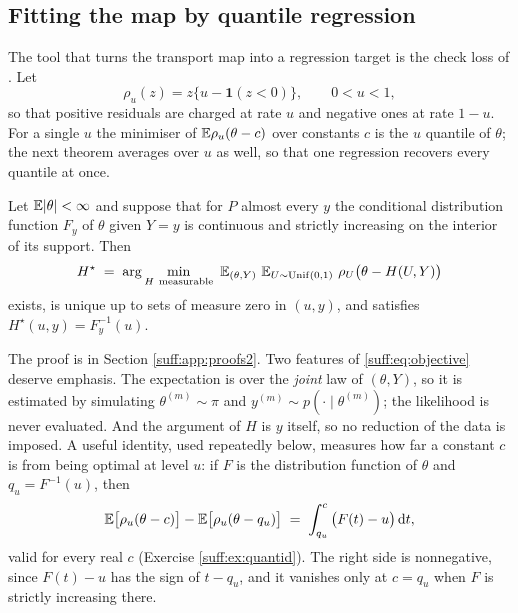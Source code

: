 \subsection{Fitting the map by quantile regression}

The tool that turns the transport map into a regression target is the check loss of
\citet{suff:koenkerbassett1978}. Let
\[
\rho_u(z) = z\{u-\mathbf{1}(z<0)\},\qquad 0<u<1,
\]
so that positive residuals are charged at rate $u$ and negative ones at rate $1-u$. For a
single $u$ the minimiser of $\mathbb{E}\rho_u(\theta-c)$ over constants $c$ is the $u$ quantile of
$\theta$; the next theorem averages over $u$ as well, so that one regression recovers every
quantile at once.

\begin{theorem}
\label{suff:thm:check}
Let $\mathbb{E}|\theta|<\infty$ and suppose that for $P$ almost every $y$ the conditional
distribution function $F_y$ of $\theta$ given $Y=y$ is continuous and strictly increasing on
the interior of its support. Then
\begin{equation}
H^\star \;=\; \arg\min_{H\ \mathrm{measurable}}\ \E_{(\theta,Y)}\ \E_{U\sim\mathrm{Unif}(0,1)}\
\rho_U\big(\theta - H(U,Y)\big)
\label{suff:eq:objective}
\end{equation}
exists, is unique up to sets of measure zero in $(u,y)$, and satisfies
$H^\star(u,y) = F^{-1}_{y}(u)$.
\end{theorem}

The proof is in Section \ref{suff:app:proofs2}. Two features of \eqref{suff:eq:objective}
deserve emphasis. The expectation is over the \emph{joint} law of $(\theta,Y)$, so it is
estimated by simulating $\theta^{(m)}\sim\pi$ and $y^{(m)}\sim p(\cdot\mid\theta^{(m)})$; the
likelihood is never evaluated. And the argument of $H$ is $y$ itself, so no reduction of the
data is imposed. A useful identity, used repeatedly below, measures how far a constant $c$ is
from being optimal at level $u$: if $F$ is the distribution function of $\theta$ and
$q_u=F^{-1}(u)$, then
\begin{equation}
\mathbb{E}\big[\rho_u(\theta-c)\big] - \mathbb{E}\big[\rho_u(\theta-q_u)\big]
\;=\; \int_{q_u}^{c}\big(F(t)-u\big)\,\mathrm{d} t ,
\label{suff:eq:quantid}
\end{equation}
valid for every real $c$ (Exercise \ref{suff:ex:quantid}). The right side is nonnegative,
since $F(t)-u$ has the sign of $t-q_u$, and it vanishes only at $c=q_u$ when $F$ is strictly
increasing there.

